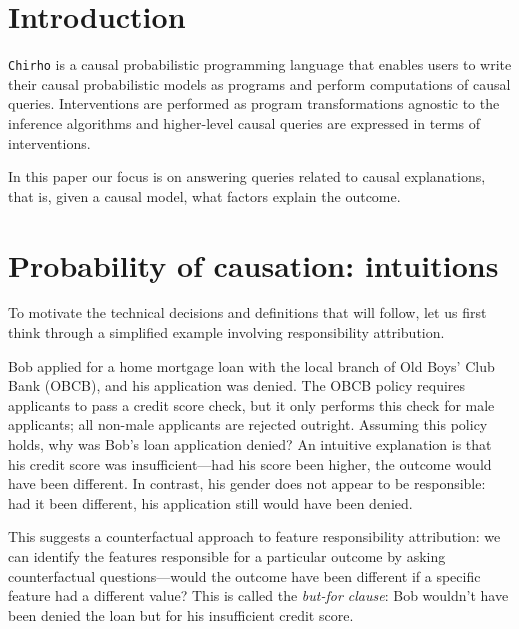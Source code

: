 \documentclass{article}
\begin{document}

\section{Introduction}

\texttt{Chirho} is a causal probabilistic programming language that enables users to write their causal probabilistic models as programs and perform computations of causal queries. Interventions are performed as program transformations agnostic to the inference algorithms and higher-level causal queries are expressed in terms of interventions.

In this paper our focus is on answering queries related to causal explanations, that is, given a causal model, what factors explain the outcome. 


\section{Probability of causation: intuitions}


To motivate the technical decisions and definitions that will follow, let us first think through a simplified example involving responsibility attribution.

Bob applied for a home mortgage loan with the local branch of Old Boys’ Club Bank (OBCB), and his application was denied. The OBCB policy requires applicants to pass a credit score check, but it only performs this check for male applicants; all non-male applicants are rejected outright. Assuming this policy holds, why was Bob’s loan application denied? An intuitive explanation is that his credit score was insufficient—had his score been higher, the outcome would have been different. In contrast, his gender does not appear to be responsible: had it been different, his application still would have been denied.



This suggests a counterfactual approach to feature responsibility attribution: we can identify the features responsible for a particular outcome by asking counterfactual questions—would the outcome have been different if a specific feature had a different value? This is called the \textit{but-for clause}: Bob wouldn’t have been denied the loan but for his insufficient credit score.  
\end{document}
